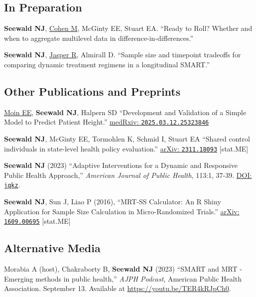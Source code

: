 \documentclass[letterpaper,11pt]{article} %
\begin{document}
        \subsection*{In Preparation}
        \begin{etaremune}
            \item \textbf{Seewald NJ}, \underline{Cohen M}, McGinty EE,  Stuart EA. ``Ready to Roll? Whether and when to aggregate multilevel data in difference-in-differences.'' 

            \item \textbf{Seewald NJ}, \underline{Jasper R}, Almirall D. ``Sample size and timepoint tradeoffs for comparing dynamic treatment regimens in a longitudinal SMART.''
        \end{etaremune}
	
	   \subsection*{Other Publications and Preprints}
		\begin{etaremune}
            \item \underline{Moin EE}, \textbf{Seewald NJ}, Halpern SD ``Development and Validation of a Simple Model to Predict Patient Height.'' \href{https://www.medrxiv.org/content/10.1101/2025.03.12.25323846}{medRxiv: \texttt{2025.03.12.25323846}}
            \item \textbf{Seewald NJ}, McGinty EE, Tormohlen K, Schmid I, Stuart EA ``Shared control individuals in state-level health policy evaluation.'' \href{https://arxiv.org/abs/2311.18093}{arXiv: \texttt{2311.18093}} [stat.ME]
			\item \textbf{Seewald NJ} (2023) ``Adaptive Interventions for a Dynamic and Responsive Public Health Approach,'' \textit{American Journal of Public Health}, 113:1, 37-39. \href{https://doi.org/jqkz}{DOI: \texttt{jqkz}}.
		    \item \textbf{Seewald NJ}, Sun J, Liao P (2016), ``MRT-SS Calculator: An R Shiny Application for Sample Size Calculation in Micro-Randomized Trials.'' \href{http://arxiv.org/abs/1609.00695}{arXiv: \texttt{1609.00695}} [stat.ME]
		\end{etaremune}

        \subsection*{Alternative Media}
        \begin{etaremune}
            \item Morabia A (host), Chakraborty B, \textbf{Seewald NJ} (2023) ``SMART and MRT - Emerging methods in public health,'' \textit{AJPH Podcast}, American Public Health Association. September 13. Available at \url{https://youtu.be/TER4kRJpCh0}.
        \end{etaremune}
		
\end{document}
